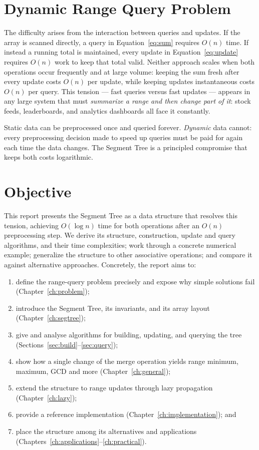 \documentclass[
  11pt,
  a4paper,
  twoside=false,
  numbers=noenddot,
  headings=big,
  parskip=half,
  toc=bibliography,
  toc=listof,
  bibliography=totoc
]{scrreprt}
\newcounter{example}[chapter]
\begin{document}
\section{Dynamic Range Query Problem}
The difficulty arises from the interaction between queries and updates. If the array is scanned directly, a query in Equation~\eqref{eq:sum} requires $O(n)$ time. If instead a running total is maintained, every update in Equation~\eqref{eq:update} requires $O(n)$ work to keep that total valid. Neither approach scales when both operations occur frequently and at large volume: keeping the sum fresh after every update costs $O(n)$ per update, while keeping updates instantaneous costs $O(n)$ per query. This tension --- fast queries versus fast updates --- appears in any large system that must \emph{summarize a range and then change part of it}: stock feeds, leaderboards, and analytics dashboards all face it constantly.

\begin{keyidea}
Static data can be preprocessed once and queried forever. \emph{Dynamic} data cannot: every preprocessing decision made to speed up queries must be paid for again each time the data changes. The Segment Tree is a principled compromise that keeps both costs logarithmic.
\end{keyidea}

\section{Objective}
This report presents the Segment Tree as a data structure that resolves this tension, achieving $O(\log n)$ time for both operations after an $O(n)$ preprocessing step. We derive its structure, construction, update and query algorithms, and their time complexities; work through a concrete numerical example; generalize the structure to other associative operations; and compare it against alternative approaches. Concretely, the report aims to:

\begin{enumerate}[nosep]
  \item define the range-query problem precisely and expose why simple solutions fail (Chapter~\ref{ch:problem});
  \item introduce the Segment Tree, its invariants, and its array layout (Chapter~\ref{ch:segtree});
  \item give and analyse algorithms for building, updating, and querying the tree (Sections~\ref{sec:build}--\ref{sec:query});
  \item show how a single change of the merge operation yields range minimum, maximum, GCD and more (Chapter~\ref{ch:general});
  \item extend the structure to range updates through lazy propagation (Chapter~\ref{ch:lazy});
  \item provide a reference implementation (Chapter~\ref{ch:implementation}); and
  \item place the structure among its alternatives and applications (Chapters~\ref{ch:applications}--\ref{ch:practical}).
\end{enumerate}
\end{document}
